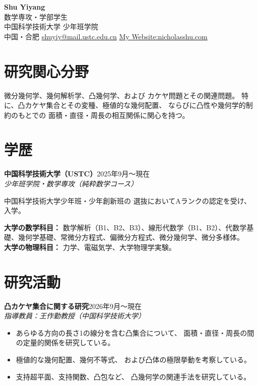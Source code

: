 \documentclass[10pt,a4paper]{article}
\newcommand{\entry}[3]{
  \textbf{#1}\hfill{\small #2}\\
  {\emph{#3}}\par
}
\begin{document}
\begin{center}
{\LARGE\bfseries Shu Yiyang}\\[4pt]
{\normalsize 数学専攻・学部学生}\\[2pt]
中国科学技術大学 少年班学院\\[2pt]
中国・合肥
\quad\textbar\quad
\href{mailto:shuyiy@mail.ustc.edu.cn}
{shuyiy@mail.ustc.edu.cn}
\quad\textbar\quad
\href{https://nicholasshu.com}{My Website:nicholasshu.com}
\end{center}

\vspace{-7pt}

\section*{研究関心分野}

微分幾何学、幾何解析学、凸幾何学、および
カケヤ問題とその関連問題。
特に、凸カケヤ集合とその変種、極値的な幾何配置、
ならびに凸性や幾何学的制約のもとでの
面積・直径・周長の相互関係に関心を持つ。

\section*{学歴}

\entry
{中国科学技術大学（USTC）}
{2025年9月～現在}
{少年班学院・数学専攻（純粋数学コース）}

中国科学技術大学少年班・少年創新班の
選抜においてAランクの認定を受け、入学。

\par
\textbf{大学の数学科目：} 数学解析（B1、B2、B3）、線形代数学（B1、B2）、代数学基礎、幾何学基礎、常微分方程式、偏微分方程式、微分幾何学、微分多様体。\\
\textbf{大学の物理科目：} 力学、電磁気学、大学物理学実験。
\section*{研究活動}

\entry
{凸カケヤ集合に関する研究}
{2026年9月～現在}
{指導教員：王作勤教授（中国科学技術大学）}

\begin{itemize}
  \item
  あらゆる方向の長さ1の線分を含む凸集合について、
  面積・直径・周長の間の定量的関係を研究している。

  \item
  極値的な幾何配置、幾何不等式、
  および凸体の極限挙動を考察している。

  \item
  支持超平面、支持関数、凸包など、
  凸幾何学の関連手法を研究している。
\end{itemize}
\end{document}
